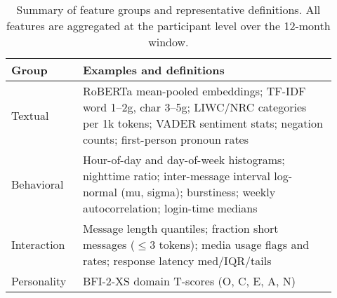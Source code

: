 \begin{table}[t]
\centering
\caption{Summary of feature groups and representative definitions. All features are aggregated at the participant level over the 12-month window.}
\label{tab:features-summary}
\begin{tabular}{p{0.20\linewidth}p{0.72\linewidth}}
\toprule
Group & Examples and definitions \\
\midrule
Textual & RoBERTa mean-pooled embeddings; TF-IDF word 1--2g, char 3--5g; LIWC/NRC categories per 1k tokens; VADER sentiment stats; negation counts; first-person pronoun rates \\
Behavioral & Hour-of-day and day-of-week histograms; nighttime ratio; inter-message interval log-normal (mu, sigma); burstiness; weekly autocorrelation; login-time medians \\
Interaction & Message length quantiles; fraction short messages (\(\leq 3\) tokens); media usage flags and rates; response latency med/IQR/tails \\
Personality & BFI-2-XS domain T-scores (O, C, E, A, N) \\
\bottomrule
\end{tabular}
\end{table}

